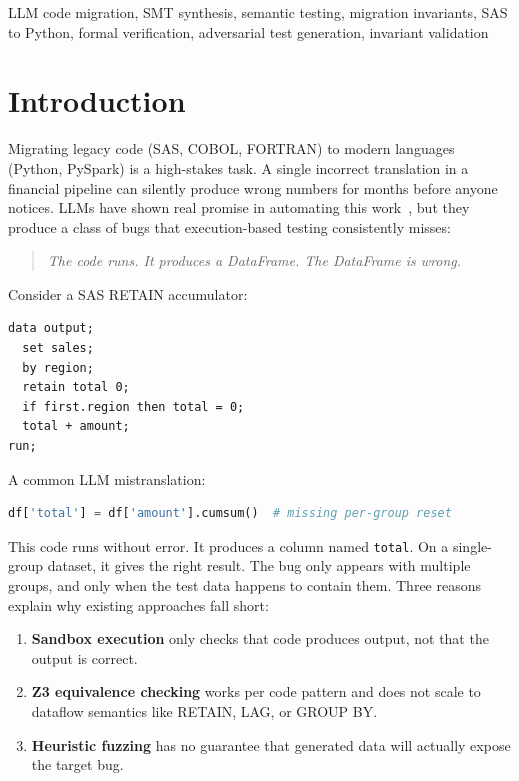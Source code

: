 \documentclass[conference]{IEEEtran}
\begin{document}
\begin{IEEEkeywords}
LLM code migration, SMT synthesis, semantic testing, migration invariants,
SAS to Python, formal verification, adversarial test generation, invariant validation
\end{IEEEkeywords}


\section{Introduction}

Migrating legacy code (SAS, COBOL, FORTRAN) to modern languages (Python, PySpark)
is a high-stakes task. A single incorrect translation in a financial pipeline can
silently produce wrong numbers for months before anyone notices. LLMs have shown real
promise in automating this work~\cite{pan2024,transcoder,avatar,hou2024}, but they produce a
class of bugs that execution-based testing consistently misses:

\begin{quote}
\textit{The code runs. It produces a DataFrame. The DataFrame is wrong.}
\end{quote}

Consider a SAS RETAIN accumulator:

\begin{lstlisting}[language=SAS]
data output;
  set sales;
  by region;
  retain total 0;
  if first.region then total = 0;
  total + amount;
run;
\end{lstlisting}

A common LLM mistranslation:

\begin{lstlisting}[language=Python]
df['total'] = df['amount'].cumsum()  # missing per-group reset
\end{lstlisting}

This code runs without error. It produces a column named \texttt{total}. On a
single-group dataset, it gives the right result. The bug only appears with multiple
groups, and only when the test data happens to contain them. Three reasons explain why
existing approaches fall short:
\begin{enumerate}
  \item \textbf{Sandbox execution} only checks that code produces output, not that the
        output is correct.
  \item \textbf{Z3 equivalence checking} works per code pattern and does not scale to
        dataflow semantics like RETAIN, LAG, or GROUP BY.
  \item \textbf{Heuristic fuzzing} has no guarantee that generated data will actually
        expose the target bug.
\end{enumerate}
\end{document}
